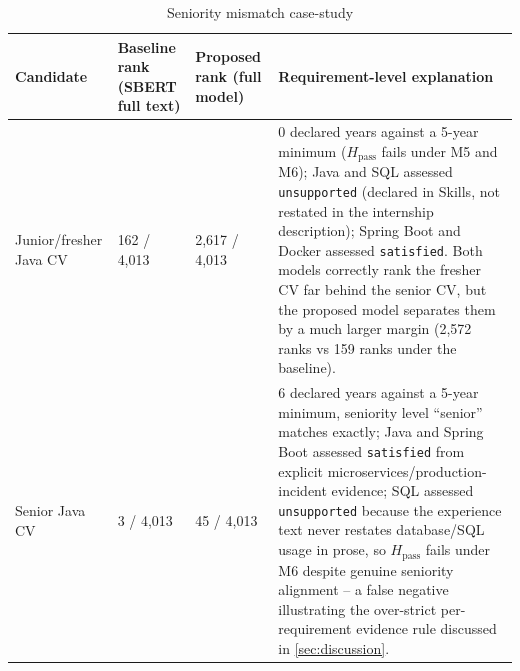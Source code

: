 \documentclass[12pt,a4paper,oneside]{report}
\begin{document}
\begin{table}[htbp]
\centering
\caption{Seniority mismatch case-study}
\label{tab:seniority-case}
\begin{tabularx}{\textwidth}{p{}p{}p{}X}
\toprule
Candidate & Baseline rank (SBERT full text) & Proposed rank (full model) & Requirement-level explanation \\
\midrule
Junior/fresher Java CV & 162 / 4,013 & 2,617 / 4,013 & 0 declared years against a 5-year minimum ($H_{\mathrm{pass}}$ fails under M5 and M6); Java and SQL assessed \texttt{unsupported} (declared in Skills, not restated in the internship description); Spring Boot and Docker assessed \texttt{satisfied}. Both models correctly rank the fresher CV far behind the senior CV, but the proposed model separates them by a much larger margin (2,572 ranks vs 159 ranks under the baseline). \\
Senior Java CV & 3 / 4,013 & 45 / 4,013 & 6 declared years against a 5-year minimum, seniority level ``senior'' matches exactly; Java and Spring Boot assessed \texttt{satisfied} from explicit microservices/production-incident evidence; SQL assessed \texttt{unsupported} because the experience text never restates database/SQL usage in prose, so $H_{\mathrm{pass}}$ fails under M6 despite genuine seniority alignment -- a false negative illustrating the over-strict per-requirement evidence rule discussed in \cref{sec:discussion}. \\
\bottomrule
\end{tabularx}
\end{table}
\end{document}
